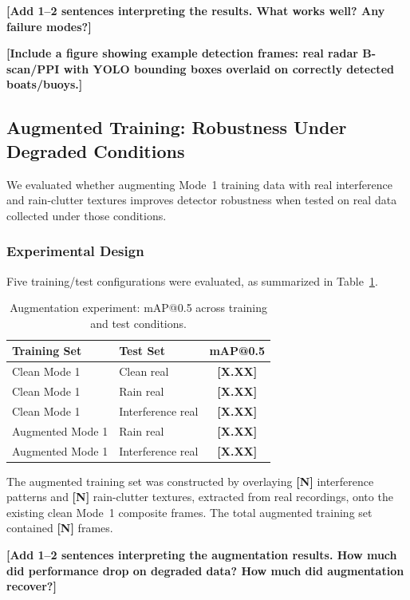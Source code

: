 \documentclass[twocolumn, 10pt]{article}
\newcommand{\ph}[1]{\textbf{[#1]}}
\begin{document}
\ph{Add 1--2 sentences interpreting the results. What works well? Any failure modes?}

\ph{Include a figure showing example detection frames: real radar B-scan/PPI with YOLO bounding boxes overlaid on correctly detected boats/buoys.}

\subsection{Augmented Training: Robustness Under Degraded Conditions}

We evaluated whether augmenting Mode~1 training data with real interference and rain-clutter textures improves detector robustness when tested on real data collected under those conditions.

\subsubsection{Experimental Design}

Five training/test configurations were evaluated, as summarized in Table~\ref{tab:augmentation}.

\begin{table}[htb]
\centering
\caption{Augmentation experiment: mAP@0.5 across training and test conditions.}
\label{tab:augmentation}
\begin{tabular}{@{}llc@{}}
\toprule
\textbf{Training Set} & \textbf{Test Set} & \textbf{mAP@0.5} \\
\midrule
Clean Mode 1 & Clean real & \ph{X.XX} \\
Clean Mode 1 & Rain real & \ph{X.XX} \\
Clean Mode 1 & Interference real & \ph{X.XX} \\
Augmented Mode 1 & Rain real & \ph{X.XX} \\
Augmented Mode 1 & Interference real & \ph{X.XX} \\
\bottomrule
\end{tabular}
\end{table}

The augmented training set was constructed by overlaying \ph{N} interference patterns and \ph{N} rain-clutter textures, extracted from real recordings, onto the existing clean Mode~1 composite frames. The total augmented training set contained \ph{N} frames.

\ph{Add 1--2 sentences interpreting the augmentation results. How much did performance drop on degraded data? How much did augmentation recover?}
\end{document}

